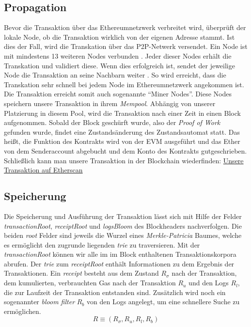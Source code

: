 \documentclass[runningheads]{llncs}
\begin{document}
\subsection{Propagation}
Bevor die Transaktion über das Ethereumnetzwerk verbreitet wird, überprüft der lokale Node, ob die Transaktion wirklich von der eigenen Adresse stammt. Ist dies der Fall, wird die Transkation über das P2P-Netwerk versendet. Ein Node ist mit mindestens 13 weiteren Nodes verbunden \cite[S. 123]{antonopoulos_mastering_2019}. Jeder dieser Nodes erhält die Transkation und validiert diese. Wenn dies erfolgreich ist, sendet der jeweilige Node die Transaktion an seine Nachbarn weiter \cite[S. 123]{antonopoulos_mastering_2019}. So wird erreicht, dass die Transkation sehr schnell bei jedem Node im Ethereumnetzwerk angekommen ist. Die Transaktion erreicht somit auch sogenannte "`Miner Nodes"'. Diese Nodes speichern unsere Transaktion in ihrem \textit{Mempool}. Abhängig von unserer Platzierung in diesem Pool, wird die Transaktion nach einer Zeit in einen Block aufgenommen. Sobald der Block geschürft wurde, also der \textit{Proof of Work} gefunden wurde, findet eine Zustandsänderung des Zustandsautomat statt. Das heißt, die Funktion des Kontrakts wird von der EVM ausgeführt und das Ether von dem Senderaccount abgebucht und dem Konto des Kontrakts gutgeschrieben. Schließlich kann man unsere Transaktion in der Blockchain wiederfinden: \href{https://ropsten.etherscan.io/tx/0x6c5cd70f3464a6b68f95ba1bb7ebb5ece5a2f1ab4d45a5bb068e727e08fa827d}{Unsere Transaktion auf Etherscan}

\subsection{Speicherung}
Die Speicherung und Ausführung der Transaktion lässt sich mit Hilfe der Felder \textit{transactionRoot}, \textit{receiptRoot} und \textit{logsBloom} des Blockheaders nachverfolgen. Die beiden \textit{root} Felder sind jeweils die Wurzel eines \textit{Merkle-Patricia} Baumes, welche es ermöglicht den zugrunde liegenden \textit{trie} zu traversieren. \cite{noauthor_ethereum/patricia_nodate} Mit der \textit{transactionRoot} können wir alle  im im Block enthaltenen Transaktionskorpora abrufen. Der \textit{trie} zum \textit{receiptRoot} enthält Informationen zu dem Ergebnis der Transaktionen. Ein \textit{receipt} besteht aus dem Zustand $ R_{\sigma} $ nach der Transaktion, dem kumulierten, verbrauchten Gas nach der Transaktion $ R_u $ und den Logs $ R_l $, die zur Laufzeit der Transaktion entstanden sind. Zusätzlich wird noch ein sogenannter \textit{bloom filter} $ R_b $ von den Logs angelegt, um eine schnellere Suche zu ermöglichen. \cite{noauthor_logs_nodate}
$$
  R \equiv (R_{\sigma}, R_u, R_l, R_b)
$$
\end{document}
